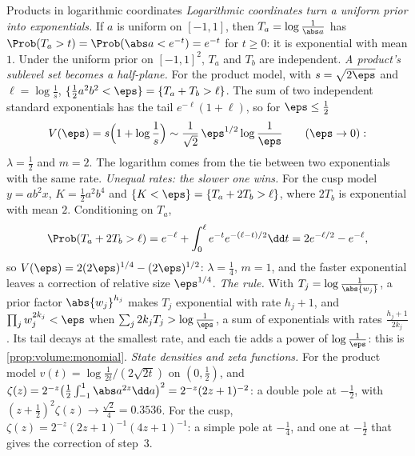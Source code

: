 \begin{refsection}
\begin{computation}{Products in logarithmic coordinates}\label{comp:volume:log}
\step \emph{Logarithmic coordinates turn a uniform prior into exponentials.} If $a$ is uniform on $[-1,1]$, then $T_a=\log\frac1{\abs a}$ has $\Prob(T_a>t)=\Prob(\abs a<e^{-t})=e^{-t}$ for $t\ge0$: it is exponential with mean $1$. Under the uniform prior on $[-1,1]^2$, $T_a$ and $T_b$ are independent.
\step \emph{A product's sublevel set becomes a half-plane.} For the product model, with $s=\sqrt{2\eps}$ and $\ell=\log\frac1s$, $\{\frac12a^2b^2<\eps\}=\{T_a+T_b>\ell\}$. The sum of two independent standard exponentials has the tail $e^{-\ell}(1+\ell)$, so for $\eps\le\frac12$
\[
V(\eps)=s\Bigl(1+\log\frac1s\Bigr)\sim\frac1{\sqrt2}\,\eps^{1/2}\log\frac1\eps\qquad(\eps\to0):
\]
$\lambda=\frac12$ and $m=2$. The logarithm comes from the tie between two exponentials with the same rate.
\step \emph{Unequal rates: the slower one wins.} For the cusp model $y=ab^2x$, $K=\frac12a^2b^4$ and $\{K<\eps\}=\{T_a+2T_b>\ell\}$, where $2T_b$ is exponential with mean $2$. Conditioning on $T_a$,
\[
\Prob(T_a+2T_b>\ell)=e^{-\ell}+\int_0^\ell e^{-t}e^{-(\ell-t)/2}\dd t=2e^{-\ell/2}-e^{-\ell},
\]
so $V(\eps)=2(2\eps)^{1/4}-(2\eps)^{1/2}$: $\lambda=\frac14$, $m=1$, and the faster exponential leaves a correction of relative size $\eps^{1/4}$.
\step \emph{The rule.} With $T_j=\log\frac1{\abs{w_j}}$, a prior factor $\abs{w_j}^{h_j}$ makes $T_j$ exponential with rate $h_j+1$, and $\prod_jw_j^{2k_j}<\eps$ when $\sum_j2k_jT_j>\log\frac1\eps$, a sum of exponentials with rates $\frac{h_j+1}{2k_j}$. Its tail decays at the smallest rate, and each tie adds a power of $\log\frac1\eps$: this is \cref{prop:volume:monomial}.
\step \emph{State densities and zeta functions.} For the product model $v(t)=\log\frac1{2t}\big/(2\sqrt{2t})$ on $(0,\frac12)$, and $\zeta(z)=2^{-z}\bigl(\frac12\int_{-1}^1\abs a^{2z}\dd a\bigr)^2=2^{-z}(2z+1)^{-2}$: a double pole at $-\frac12$, with $(z+\frac12)^2\zeta(z)\to\frac{\sqrt2}4=0.3536$. For the cusp, $\zeta(z)=2^{-z}(2z+1)^{-1}(4z+1)^{-1}$: a simple pole at $-\frac14$, and one at $-\frac12$ that gives the correction of step~3.
\end{computation}


\end{refsection}
